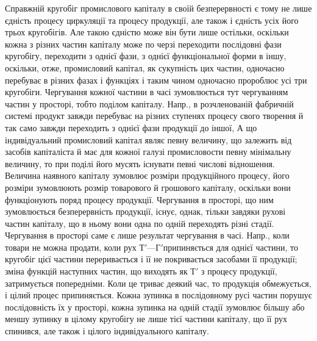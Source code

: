 Справжній кругобіг промислового капіталу в своїй безперервності
є тому не лише єдність процесу циркуляції та процесу продукції, але
також і єдність усіх його трьох кругобігів. Але такою єдністю може він
бути лише остільки, оскільки кожна з різних частин капіталу може по
черзі переходити послідовні фази кругобігу, переходити з однієї фази,
з однієї функціональної форми в іншу, оскільки, отже, промисловий капітал,
як сукупність цих частин, одночасно перебуває в різних фазах
і функціях і таким чином одночасно пророблює усі три кругобіги. Чергування
кожної частини в часі зумовлюється тут чергуванням частин у
просторі, тобто поділом капіталу. Напр., в розчленованій фабричній
системі продукт завжди перебуває на різних ступенях процесу свого
творення й так само завжди переходить з однієї фази продукції до іншої,
А що індивідуальний промисловий капітал являє певну величину, що
залежить від засобів капіталіста й має для кожної галузі промисловости
певну мінімальну величину, то при поділі його мусять існувати певні числові
відношення. Величина наявного капіталу зумовлює розміри продукційного
процесу, його розміри зумовлюють розмір товарового й грошового
капіталу, оскільки вони функціонують поряд процесу продукції. Чергування
в просторі, що ним зумовлюється безперервність продукції, існує, однак,
тільки завдяки рухові частин капіталу, що в ньому вони одна по одній переходять
різні стадії. Чергування в просторі саме є лише результат чергування
в часі. Напр., коли товари не можна продати, коли рух $Т' — Г'
п$рипиняється для однієї частини, то кругобіг цієї частини переривається
і її не покривається засобами її продукції; зміна функцій наступних
частин, що виходять як $Т'$ з процесу продукції, затримується
попередніми. Коли це триває деякий час, то продукція обмежується, і
цілий процес припиняється. Кожна зупинка в послідовному русі частин
порушує послідовність їх у просторі, кожна зупинка на одній стадії
зумовлює більшу або меншу зупинку в цілому кругобігу не лише тієї
частини капіталу, що її рух спинився, але також і цілого індивідуального
капіталу.

